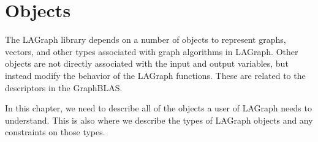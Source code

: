 \chapter{Objects}
\label{Chp:Objects}

The LAGraph library depends on a number of objects to represent 
graphs, vectors, and other types associated with graph algorithms in LAGraph.
Other objects are not directly associated with the input and output variables, 
but instead modify the behavior of the LAGraph functions.  These are 
related to the descriptors in the GraphBLAS.

In this chapter, we need to describe all of the objects a user of LAGraph
needs to understand.  This is also where we describe the types of LAGraph
objects and any constraints on those types.


